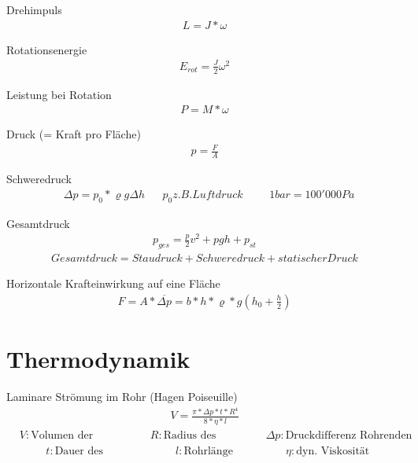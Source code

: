 \documentclass[17pt]{extarticle}
\begin{document}
	Drehimpuls 
	\begin{align}
		L = J * \omega
	\end{align}
	
	Rotationsenergie
	\begin{align}
		E_{rot} = \frac{J}{2} \omega^2
	\end{align}
	
	Leistung bei Rotation
	\begin{align}
		P = M * \omega
	\end{align}
	
	Druck (= Kraft pro Fläche)
	\begin{align}
		p = \frac{F}{A}
	\end{align}	
	
	Schweredruck 
	\begin{align}
		&\Delta p = p_0 * \varrho g \Delta h
		&&p_0 z.B. Luftdruck 
		&&&1 bar = 100'000 Pa
	\end{align}
	
	Gesamtdruck
	\begin{align}
		p_{ges} = \frac{p}{2}v^2 + pgh + p_{st}
	\end{align}
	\begin{align}		
		Gesamtdruck = Staudruck + Schweredruck + statischer Druck
	\end{align}

	Horizontale Krafteinwirkung auf eine Fläche
	\begin{align}
		F = A * \overline{\Delta p} = b*h * \varrho*g (h_{0} + \frac{h}{2})
	\end{align}
	
	
\section{Thermodynamik}
	


	Laminare Strömung im Rohr (Hagen Poiseuille)
	\begin{align}
		V = \frac{\pi * \Delta p * t * R^4}{8 * \eta * l}
	\end{align}
	\begin{align}
		&V: \text{Volumen der Flüssigkeit}
		&&R: \text{Radius des Rohres}
		&&&\Delta p: \text{Druckdifferenz Rohrenden}
	\end{align}
	\begin{align}
		&&&&t: \text{Dauer des Flusses}
		&&&&&l: \text{Rohrlänge}
		&&&&&&\eta: \text{dyn. Viskosität (konst.)}
	\end{align}
\end{document}
